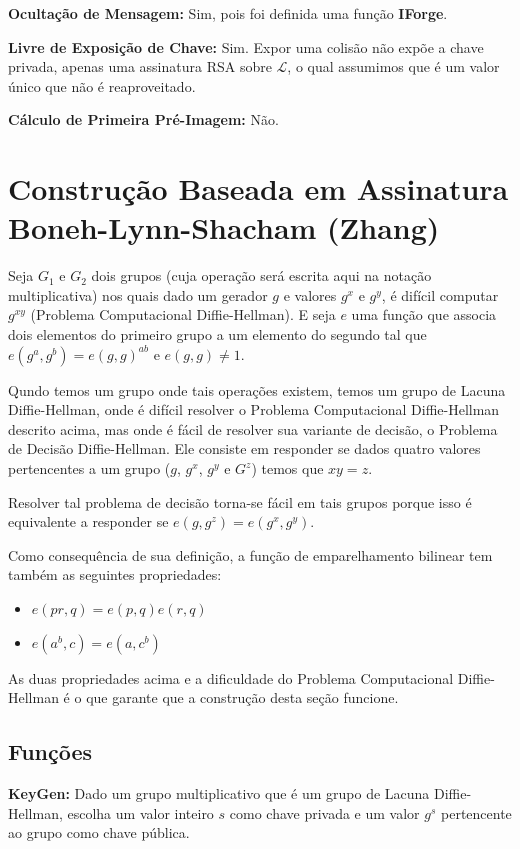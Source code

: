 \documentclass[a4paper]{article}
\begin{document}
\textbf{Ocultação de Mensagem: }Sim, pois foi definida uma função
\textbf{IForge}.

\textbf{Livre de Exposição de Chave: } Sim. Expor uma colisão não
expõe a chave privada, apenas uma assinatura RSA sobre $\mathcal{L}$,
o qual assumimos que é um valor único que não é reaproveitado.
  
\textbf{Cálculo de Primeira Pré-Imagem: }Não.

\section{Construção Baseada em Assinatura Boneh-Lynn-Shacham (Zhang) \cite{zhang}}

Seja $G_1$ e $G_2$ dois grupos (cuja operação será escrita aqui na
notação multiplicativa) nos quais dado um gerador $g$ e valores $g^x$
e $g^y$, é difícil computar $g^{xy}$ (Problema Computacional
Diffie-Hellman). E seja $e$ uma função que associa dois elementos do
primeiro grupo a um elemento do segundo tal que $e(g^a, g^b) = e(g,
g)^{ab}$ e $e(g, g) \neq 1$.

Qundo temos um grupo onde tais operações existem, temos um grupo de
Lacuna Diffie-Hellman, onde é difícil resolver o Problema
Computacional Diffie-Hellman descrito acima, mas onde é fácil de
resolver sua variante de decisão, o Problema de Decisão
Diffie-Hellman. Ele consiste em responder se dados quatro valores
pertencentes a um grupo ($g$, $g^x$, $g^y$ e $G^z$) temos que $xy=z$.

Resolver tal problema de decisão torna-se fácil em tais grupos porque
isso é equivalente a responder se $e(g, g^z) = e(g^x, g^y)$.

Como consequência de sua definição, a função de emparelhamento
bilinear tem também as seguintes propriedades:

\begin{itemize}
\item$e(pr, q) = e(p, q)e(r, q)$
\item$e(a^b, c) = e(a, c^b)$
\end{itemize}

As duas propriedades acima e a dificuldade do Problema Computacional
Diffie-Hellman é o que garante que a construção desta seção funcione.

\subsection{Funções}

\textbf{KeyGen: }Dado um grupo multiplicativo que é um grupo de Lacuna
Diffie-Hellman, escolha um valor inteiro $s$ como chave privada e um
valor $g^s$ pertencente ao grupo como chave pública.
\end{document}

